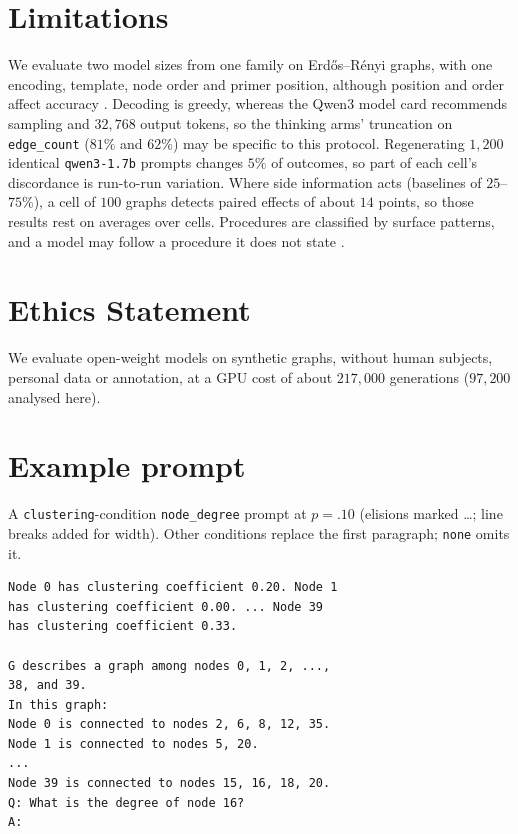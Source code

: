 \documentclass[11pt]{article}
\begin{document}
\section*{Limitations}
\label{sec:limitations}

We evaluate two model sizes from one family on Erd\H{o}s--R\'enyi graphs, with
one encoding, template, node order and primer position, although position and
order affect accuracy \citep{liu2024lostinthemiddle,ge2025graph}. Decoding is
greedy, whereas the Qwen3 model card \citep{qwen2025qwen3card} recommends
sampling and $32{,}768$ output tokens, so the thinking arms' truncation on
\texttt{edge\_count} ($81\%$ and $62\%$) may be specific to this protocol.
Regenerating $1{,}200$ identical \texttt{qwen3-1.7b} prompts changes $5\%$ of
outcomes, so part of each cell's discordance is run-to-run variation. Where side information acts
(baselines of $25$--$75\%$), a cell of $100$ graphs detects paired effects of
about $14$ points, so those results rest on averages over cells. Procedures are classified by surface patterns, and a
model may follow a procedure it does not state \citep{turpin2023unfaithful}.

\section*{Ethics Statement}

We evaluate open-weight models on synthetic graphs, without human subjects,
personal data or annotation, at a GPU cost of about $217{,}000$ generations
($97{,}200$ analysed here).%
\label{sec:ethics-end}




\appendix
\raggedbottom

\section{Example prompt}
\label{sec:appendix-prompt}

A \texttt{clustering}-condition \texttt{node\_degree} prompt at $p{=}.10$
(elisions marked \dots; line breaks added for width). Other conditions
replace the first paragraph; \texttt{none} omits it.

{\scriptsize
\begin{verbatim}
Node 0 has clustering coefficient 0.20. Node 1
has clustering coefficient 0.00. ... Node 39
has clustering coefficient 0.33.

G describes a graph among nodes 0, 1, 2, ...,
38, and 39.
In this graph:
Node 0 is connected to nodes 2, 6, 8, 12, 35.
Node 1 is connected to nodes 5, 20.
...
Node 39 is connected to nodes 15, 16, 18, 20.
Q: What is the degree of node 16?
A:
\end{verbatim}
}
\end{document}
